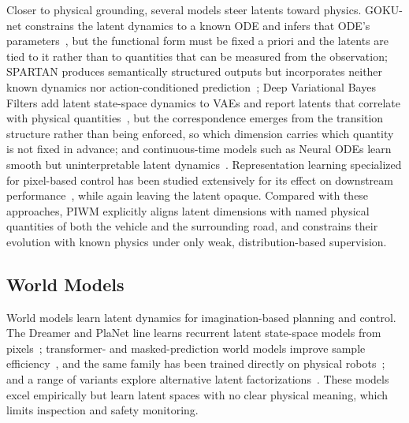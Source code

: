 \documentclass[preprint,12pt]{elsarticle}
\begin{document}
Closer to physical grounding, several models steer latents toward physics.
GOKU-net constrains the latent dynamics to a known ODE and infers that ODE's
parameters~\cite{linial_generative_2021}, but the functional form must be fixed a
priori and the latents are tied to it rather than to quantities that can be
measured from the observation; SPARTAN produces
semantically structured outputs but incorporates neither known dynamics nor
action-conditioned prediction~\cite{lei2024spartan}; Deep Variational Bayes
Filters add latent state-space dynamics to VAEs and report latents that correlate
with physical quantities~\cite{karl2016deep}, but the correspondence emerges from
the transition structure rather than being enforced, so which dimension carries
which quantity is not fixed in advance; and continuous-time models such as Neural
ODEs learn smooth but uninterpretable latent dynamics~\cite{chen2018neural}.
Representation learning specialized for pixel-based control has been studied
extensively for its effect on downstream
performance~\cite{tomar2021learningrepresentationspixelbasedcontrol}, while again
leaving the latent opaque.
Compared with these approaches, PIWM explicitly aligns latent dimensions with
named physical quantities of both the vehicle and the surrounding road, and
constrains their evolution with known physics under only weak, distribution-based
supervision.

\subsection{World Models}\label{sec:rw_wm}

World models learn latent dynamics for imagination-based planning and control.
The Dreamer and PlaNet line learns recurrent latent state-space models from
pixels~\cite{hafner2019learning, hafner2020mastering, hafner2023mastering};
transformer- and masked-prediction world models improve sample
efficiency~\cite{micheli2022transformers, seo2023masked}, and the same family has
been trained directly on physical robots~\cite{wu2023daydreamer}; and a range of
variants explore alternative latent
factorizations~\cite{ha2018world, zhang2021world, zhao2024decomposed}.
These models excel empirically but learn latent spaces with no clear physical
meaning, which limits inspection and safety monitoring.
\end{document}
